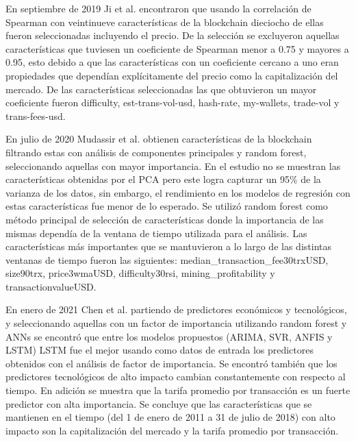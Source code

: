 En septiembre de 2019 Ji et al.  \cite{jiComparativeStudyBitcoin2019} encontraron que usando la correlación de Spearman con veintinueve características de la blockchain dieciocho de ellas fueron seleccionadas incluyendo el precio. De la selección se excluyeron aquellas características que tuviesen un coeficiente de Spearman menor a 0.75 y mayores a 0.95, esto debido a que las características con un coeficiente cercano a uno eran propiedades que dependían explícitamente del precio como la capitalización del mercado. De las características seleccionadas las que obtuvieron un mayor coeficiente fueron difficulty, est-trans-vol-usd, hash-rate, my-wallets, trade-vol y trans-fees-usd.

En julio de 2020 Mudassir et al. \cite{mudassirTimeseriesForecastingBitcoin2020} obtienen características de la blockchain filtrando estas con análisis de componentes principales y random forest, seleccionando aquellas con mayor importancia. En el estudio no se muestran las características obtenidas por el PCA pero este logra capturar un 95\% de la varianza de los datos, sin embargo, el rendimiento en los modelos de regresión con estas características fue menor de lo esperado.
Se utilizó random forest como método principal de selección de características donde la importancia de las mismas dependía de la ventana de tiempo utilizada para el análisis. Las características más importantes que se mantuvieron a lo largo de las distintas ventanas de tiempo fueron las siguientes: median\_transaction\_fee30trxUSD, size90trx, price3wmaUSD, difficulty30rsi, mining\_profitability y transactionvalueUSD. 


En enero de 2021 Chen et al. \cite{chenMachineLearningModel2021} partiendo de predictores económicos y tecnológicos, y seleccionando aquellas con un factor de importancia utilizando random forest y ANNs se encontró que entre los modelos propuestos (ARIMA, SVR, ANFIS y LSTM) LSTM fue el mejor usando como datos de entrada los predictores obtenidos con el análisis de factor de importancia. Se encontró también que los predictores tecnológicos de alto impacto cambian constantemente con respecto al tiempo. En adición se muestra que la tarifa promedio por transacción es un fuerte predictor con alta importancia. Se concluye que las características que se mantienen en el tiempo (del 1 de enero de 2011 a 31 de julio de 2018) con alto impacto son la capitalización del mercado y la tarifa promedio por transacción.

